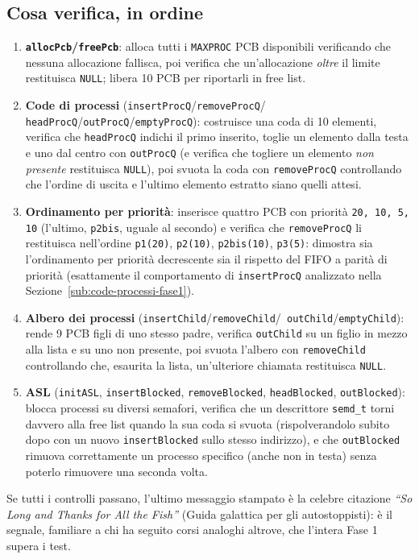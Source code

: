 \documentclass[11pt,a4paper]{article}
\newcommand{\code}[1]{\texttt{#1}}
\begin{document}
\subsection{Cosa verifica, in ordine}
\begin{enumerate}
\item \textbf{\code{allocPcb}/\code{freePcb}}: alloca tutti i
  \code{MAXPROC} PCB disponibili verificando che nessuna allocazione
  fallisca, poi verifica che un'allocazione \emph{oltre} il limite
  restituisca \code{NULL}; libera 10 PCB per riportarli in free list.
\item \textbf{Code di processi} (\code{insertProcQ}/\code{removeProcQ}/\code{
  headProcQ}/\code{outProcQ}/\code{emptyProcQ}): costruisce una coda di 10
  elementi, verifica che \code{headProcQ} indichi il primo inserito, toglie
  un elemento dalla testa e uno dal centro con \code{outProcQ} (e verifica
  che togliere un elemento \emph{non presente} restituisca \code{NULL}),
  poi svuota la coda con \code{removeProcQ} controllando che l'ordine di
  uscita e l'ultimo elemento estratto siano quelli attesi.
\item \textbf{Ordinamento per priorità}: inserisce quattro PCB con priorità
  \code{20, 10, 5, 10} (l'ultimo, \code{p2bis}, uguale al secondo) e
  verifica che \code{removeProcQ} li restituisca nell'ordine
  \code{p1(20)}, \code{p2(10)}, \code{p2bis(10)}, \code{p3(5)}: dimostra sia
  l'ordinamento per priorità decrescente sia il rispetto del FIFO a parità
  di priorità (esattamente il comportamento di \code{insertProcQ}
  analizzato nella Sezione~\ref{sub:code-processi-fase1}).
\item \textbf{Albero dei processi} (\code{insertChild}/\code{removeChild}/\code{
  outChild}/\code{emptyChild}): rende 9 PCB figli di uno stesso padre,
  verifica \code{outChild} su un figlio in mezzo alla lista e su uno non
  presente, poi svuota l'albero con \code{removeChild} controllando che,
  esaurita la lista, un'ulteriore chiamata restituisca \code{NULL}.
\item \textbf{ASL} (\code{initASL}, \code{insertBlocked},
  \code{removeBlocked}, \code{headBlocked}, \code{outBlocked}): blocca
  processi su diversi semafori, verifica che un descrittore
  \code{semd\_t} torni davvero alla free list quando la sua coda si
  svuota (rispolverandolo subito dopo con un nuovo \code{insertBlocked}
  sullo stesso indirizzo), e che \code{outBlocked} rimuova correttamente un
  processo specifico (anche non in testa) senza poterlo rimuovere una
  seconda volta.
\end{enumerate}
Se tutti i controlli passano, l'ultimo messaggio stampato è la celebre
citazione \emph{``So Long and Thanks for All the Fish''} (Guida galattica
per gli autostoppisti): è il segnale, familiare a chi ha seguito corsi
analoghi altrove, che l'intera Fase 1 supera i test.
\end{document}
